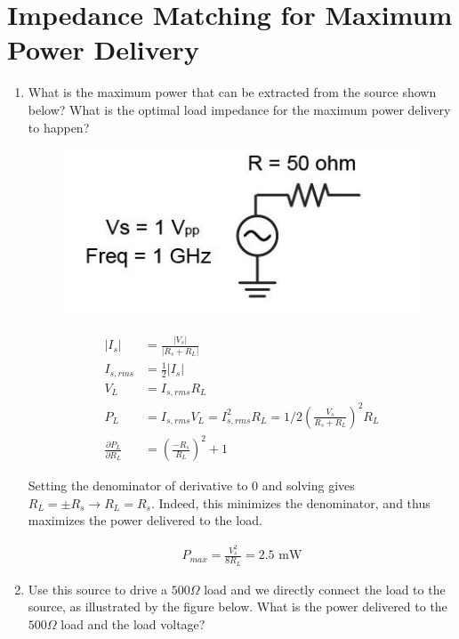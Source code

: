 \documentclass[11pt]{article}
\begin{document}
\section{Impedance Matching for Maximum Power Delivery}

\begin{enumerate}
	\item What is the maximum power that can be extracted from the source shown below? What is the optimal load impedance for the maximum power delivery to happen?
		\begin{figure}[H]
		\centering \includegraphics[width=\textwidth-10cm]{images/problem3a.jpg}
	\end{figure}
	
	\begin{align*}
		|I_{s}| &= \frac{|V_s|}{|R_s + R_L|} \\
		I_{s,rms} &= \frac{1}{2} |I_{s}| \\
		V_{L} &= I_{s,rms} R_L \\
		P_{L} &= I_{s,rms} V_L = I_{s,rms}^2 R_L = 1/2 (\frac{V_s}{R_s + R_L})^2 R_L \\
		\frac{\partial P_L}{\partial R_L} &= (\frac{-R_s}{R_L})^2 + 1
	\end{align*}
	
	Setting the denominator of derivative to 0 and solving gives $R_L = \pm R_s \rightarrow R_L = R_s$. Indeed, this minimizes the denominator, and thus maximizes the power delivered to the load.
	
	\begin{align*}
		P_{max} = \frac{V_s^2}{8 R_L} = 2.5 \text{ mW}
	\end{align*}
	
	\item Use this source to drive a $500\Omega$ load and we directly connect the load to the source, as illustrated by the figure below. What is the power delivered to the $500 \Omega$ load and the load voltage?
	

\end{enumerate}
\end{document}

